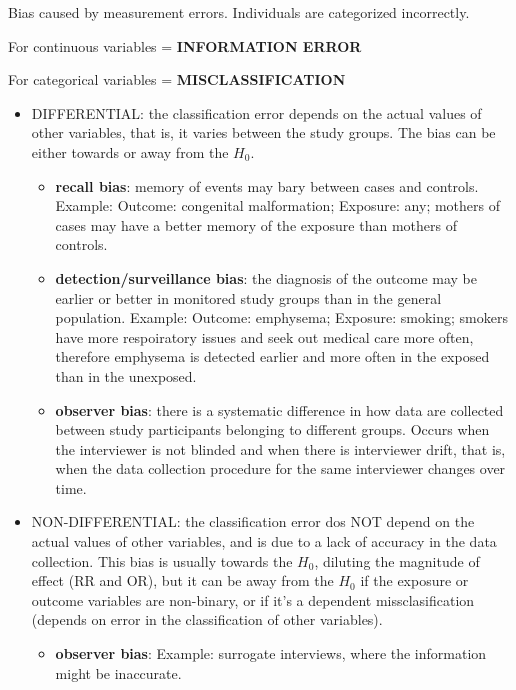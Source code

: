\documentclass[
]{article}
\providecommand{\tightlist}{%
  \setlength{\itemsep}{0pt}\setlength{\parskip}{0pt}}
\begin{document}
Bias caused by measurement errors. Individuals are categorized
incorrectly.

For continuous variables = \textbf{INFORMATION ERROR}

For categorical variables = \textbf{MISCLASSIFICATION}

\begin{itemize}
\item
  DIFFERENTIAL: the classification error depends on the actual values of
  other variables, that is, it varies between the study groups. The bias
  can be either towards or away from the \(H_0\).

  \begin{itemize}
  \item
    \textbf{recall bias}: memory of events may bary between cases and
    controls. Example: Outcome: congenital malformation; Exposure: any;
    mothers of cases may have a better memory of the exposure than
    mothers of controls.
  \item
    \textbf{detection/surveillance bias}: the diagnosis of the outcome
    may be earlier or better in monitored study groups than in the
    general population. Example: Outcome: emphysema; Exposure: smoking;
    smokers have more respoiratory issues and seek out medical care more
    often, therefore emphysema is detected earlier and more often in the
    exposed than in the unexposed.
  \item
    \textbf{observer bias}: there is a systematic difference in how data
    are collected between study participants belonging to different
    groups. Occurs when the interviewer is not blinded and when there is
    interviewer drift, that is, when the data collection procedure for
    the same interviewer changes over time.
  \end{itemize}
\item
  NON-DIFFERENTIAL: the classification error dos NOT depend on the
  actual values of other variables, and is due to a lack of accuracy in
  the data collection. This bias is usually towards the \(H_0\),
  diluting the magnitude of effect (RR and OR), but it can be away from
  the \(H_0\) if the exposure or outcome variables are non-binary, or if
  it's a dependent missclasification (depends on error in the
  classification of other variables).

  \begin{itemize}
  \tightlist
  \item
    \textbf{observer bias}: Example: surrogate interviews, where the
    information might be inaccurate.
  \end{itemize}


\end{itemize}
\end{document}
